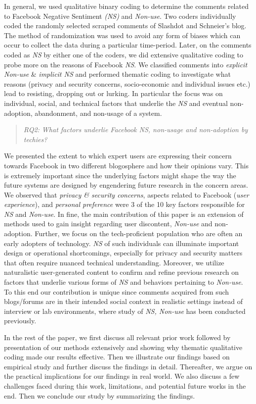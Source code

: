  In general, we used qualitative binary coding to determine the comments related to Facebook Negative Sentiment \emph{(NS)} and \emph{Non-use}. Two coders individually coded the randomly selected scraped comments of Slashdot and Schneier's blog. The method of randomization was used to avoid any form of biases which can occur to collect the data during a particular time-period. Later, on the comments coded as \emph{NS} by either one of the coders, we did extensive qualitative coding  to probe more on the reasons of Facebook \emph{NS}. We classified comments into \emph{explicit Non-use} \& \emph{implicit NS} and performed thematic coding to investigate what reasons (privacy and security concerns, socio-economic and individual issues etc.) lead to resisting, dropping out or lurking. In particular the focus was on individual, social, and technical factors that underlie the \emph{NS} and eventual non-adoption, abandonment, and non-usage of a system. 
 
 \begin{quote}
    \textit{RQ2: What factors underlie Facebook \textit{NS}, non-usage and non-adoption by techies?}

\end{quote}

We presented the extent to which expert users are expressing their concern towards Facebook in two different blogosphere and how their opinions vary. This is extremely important since the underlying factors might shape the way the future systems are designed by engendering future research in the concern areas. We observed that \textit{privacy \& security concerns}, aspects related to Facebook (\textit{user experience}), and \textit{personal preference} were 3 of the 10 key factors responsible for \emph{NS} and \emph{Non-use}. In fine, the main contribution of this paper is an extension of methods used to gain insight regarding user discontent, \textit{Non-use} and non-adoption. Further, we focus on the tech-proficient population who are often an early adopters of technology. \emph{NS} of such individuals can illuminate important design or operational shortcomings, especially for privacy and security matters that often require nuanced technical understanding. Moreover, we utilize naturalistic user-generated content to confirm and refine previous research on factors that underlie various forms of \emph{NS} and behaviors pertaining to \emph{Non-use}. To this end our contribution is unique since comments acquired from such blogs/forums are in their intended social context in realistic settings instead of interview or lab environments, where study of \emph{NS, Non-use} has been conducted previously.


In the rest of the paper, we first discuss all relevant prior work followed by presentation of our methods extensively and showing why thematic qualitative coding made our results effective. Then we illustrate our findings based on empirical study and further discuss the findings in detail. Thereafter, we argue on the practical implications for our findings in real world. We also discuss a few challenges faced during this work, limitations, and potential future works in the end. Then we conclude our study by summarizing the findings. 